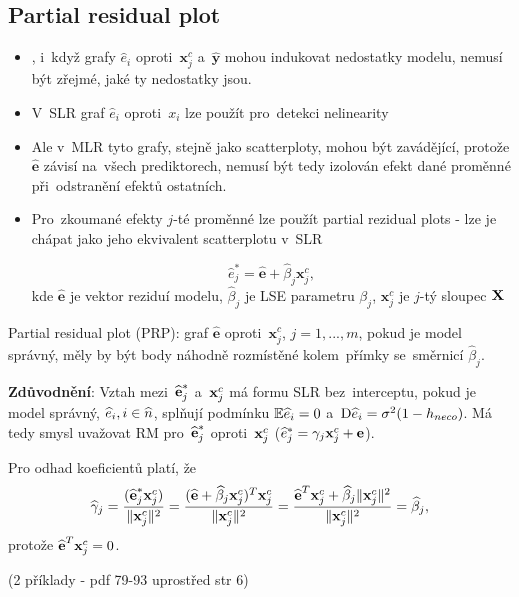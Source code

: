 \subsection{Partial residual plot}
\begin{itemize}
\item, i~když grafy $\widehat{e}_i$ oproti~$\textbf{x}_j^c$ a~$\widehat{\textbf{y}}$ mohou indukovat nedostatky modelu, nemusí být zřejmé, jaké ty nedostatky jsou.
\item V~SLR graf $\widehat{e}_i$ oproti~$x_i$ lze použít pro~detekci nelinearity
\item Ale v~MLR tyto grafy, stejně jako scatterploty, mohou být zavádějící, protože $\widehat{\textbf{e}}$ závisí na~všech prediktorech, nemusí být tedy izolován efekt dané proměnné při~odstranění efektů ostatních.
\item Pro~zkoumané efekty $j$-té proměnné lze použít partial rezidual plots - lze je chápat jako jeho ekvivalent scatterplotu v~SLR

\begin{define}
 $$
   \widehat{e}_j^* = \widehat{\textbf{e}} + \widehat{\beta}_j \textbf{x}_j^c,
 $$
 kde $\widehat{\textbf{e}}$ je vektor reziduí modelu, $\widehat{\beta}_j$ je LSE parametru $\beta_j$, $\textbf{x}_j^c$ je $j$-tý sloupec $\textbf{X}$
\end{define}
\end{itemize}
Partial residual plot (PRP): graf $\widehat{\textbf{e}}$ oproti~$\textbf{x}_j^c$, $j = 1,..., m$, pokud je model správný, měly by být body náhodně rozmístěné kolem~přímky se~směrnicí $\widehat{\beta}_j$.

\textbf{Zdůvodnění}: Vztah mezi~$\widehat{\textbf{e}}_j^*$ a~$\textbf{x}_j^c$ má formu SLR bez~interceptu, pokud je model správný, $\widehat{e}_i, i\in\widehat{n} $, splňují podmínku $\mathbb{E} \widehat{e}_i = 0$ a~$\mathrm{D} \widehat{e}_i = \sigma^2(1 - h_{neco})$. Má tedy smysl uvažovat RM pro~$\widehat{\textbf{e}}_j^*$ oproti~$\textbf{x}_j^c$ ($\widehat{e}_j^* = \gamma_j \textbf{x}_j^c + \textbf{e}$).

\newcommand{\hg}{\widehat{\gamma}}

Pro odhad koeficientů platí, že
 $$
\hg_j = \frac{(\heb_j^* \x_j^c)}{\norm{\x_j^c}^2} = \frac{(\heb + \wbeta_j \x_j^c)^T \x_j^c}{\norm{\x_j^c}^2} = \frac{\heb^T \x_j^c + \wbeta_j \norm{\x_j^c}^2}{\norm{\x_j^c}^2} = \wbeta_j,
 $$
protože $\widehat{\textbf{e}}^T \textbf{x}_j^c = 0$.

(2 příklady - pdf 79-93 uprostřed str 6)

\newcommand{\wb}{\mathbf{w}}
\newcommand{\identita}{\mathbb{I}}
\newcommand{\Xmj}{\X_{(-j)}}
\newcommand{\Xmi}{\X_{(-i)}}

